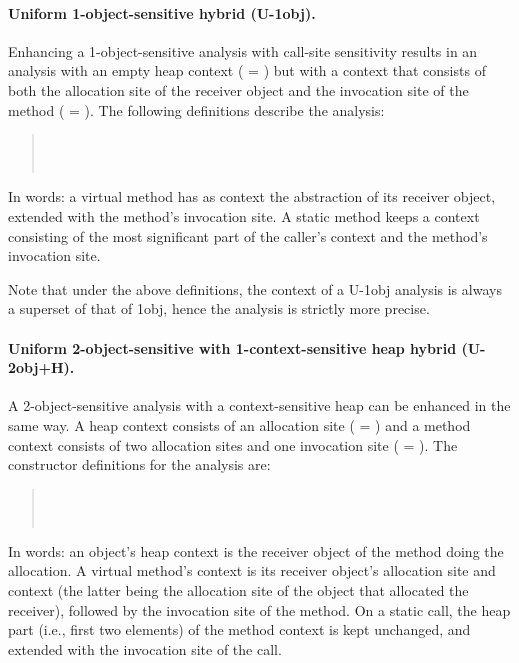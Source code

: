 \paragraph{Uniform 1-object-sensitive hybrid (U-1obj).}

Enhancing a 1-object-sensitive analysis with call-site sensitivity
results in an analysis with an empty heap context ( =
\args{\{$\star$\}}) but with a context that consists of both the
allocation site of the receiver object and the invocation site of the
method ( = ). The following definitions
describe the analysis:
\begin{quote}
 \\
 \\
\end{quote}
In words: a virtual method has as context the abstraction of its
receiver object, extended with the method's invocation site.  A static
method keeps a context consisting of the most significant part of the
caller's context and the method's invocation site.  

Note that under the above definitions, the context of a U-1obj
analysis is always a superset of that of 1obj, hence the analysis is
strictly more precise.

\paragraph{Uniform 2-object-sensitive with 1-context-sensitive heap hybrid (U-2obj+H).}

A 2-object-sensitive analysis with a context-sensitive heap can be
enhanced in the same way. A heap context consists of an allocation
site ( = ) and a method context consists of two
allocation sites and one invocation site ( = ).  The constructor definitions for the analysis are:
\begin{quote}
 \\
 \\
\end{quote}
In words: an object's heap context is the receiver object of the
method doing the allocation. A virtual method's context is its
receiver object's allocation site and context (the latter being the
allocation site of the object that allocated the receiver), followed
by the invocation site of the method. On a static call, the heap part
(i.e., first two elements) of the method context is kept unchanged,
and extended with the invocation site of the call.

